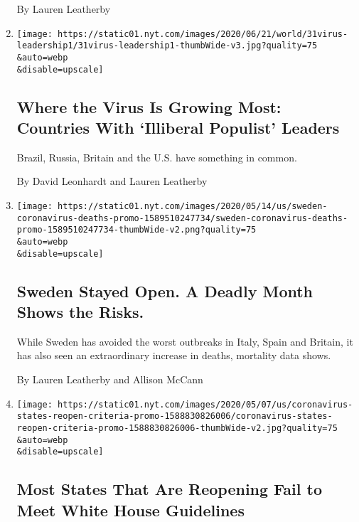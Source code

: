 \begin{enumerate}
  By Lauren Leatherby
\item
  \href{/2020/06/02/briefing/coronavirus-populist-leaders.html}{}

  \texttt{[image: https://static01.nyt.com/images/2020/06/21/world/31virus-leadership1/31virus-leadership1-thumbWide-v3.jpg?quality=75\\\&auto=webp\\\&disable=upscale]}

  \hypertarget{where-the-virus-is-growing-most-countries-with-illiberal-populist-leaders}{%
  \subsection{Where the Virus Is Growing Most: Countries With `Illiberal
  Populist'
  Leaders}\label{where-the-virus-is-growing-most-countries-with-illiberal-populist-leaders}}

  Brazil, Russia, Britain and the U.S. have something in common.

  By David Leonhardt and Lauren Leatherby
\item
  \href{/interactive/2020/05/15/world/europe/sweden-coronavirus-deaths.html}{}

  \texttt{[image: https://static01.nyt.com/images/2020/05/14/us/sweden-coronavirus-deaths-promo-1589510247734/sweden-coronavirus-deaths-promo-1589510247734-thumbWide-v2.png?quality=75\\\&auto=webp\\\&disable=upscale]}

  \hypertarget{sweden-stayed-open-a-deadly-month-shows-the-risks}{%
  \subsection{Sweden Stayed Open. A Deadly Month Shows the
  Risks.}\label{sweden-stayed-open-a-deadly-month-shows-the-risks}}

  While Sweden has avoided the worst outbreaks in Italy, Spain and
  Britain, it has also seen an extraordinary increase in deaths,
  mortality data shows.

  By Lauren Leatherby and Allison McCann
\item
  \href{/interactive/2020/05/07/us/coronavirus-states-reopen-criteria.html}{}

  \texttt{[image: https://static01.nyt.com/images/2020/05/07/us/coronavirus-states-reopen-criteria-promo-1588830826006/coronavirus-states-reopen-criteria-promo-1588830826006-thumbWide-v2.jpg?quality=75\\\&auto=webp\\\&disable=upscale]}

  \hypertarget{most-states-that-are-reopening-fail-to-meet-white-house-guidelines}{%
  \subsection{Most States That Are Reopening Fail to Meet White House
  Guidelines}\label{most-states-that-are-reopening-fail-to-meet-white-house-guidelines}}


\end{enumerate}
